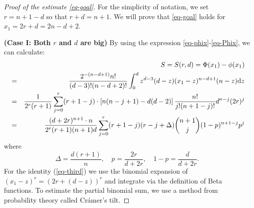 \documentclass[12pt]{amsart}
\theoremstyle{definition}
\def\dif{{\rm d}}
\begin{document}
\begin{proof}[Proof of the estimate \eqref{eq-goal}]\label{proof-goal}
For the simplicity of notation, we set $r=n+1-d$ so that $r+d=n+1$. 
We will prove that \eqref{eq-goal} holds for $x_1=2r+d=2n-d+2$. 

\textbf{(Case I: Both $r$ and $d$ are big)}
By using the expression \eqref{eq-phix}-\eqref{eq-Phix}, we can calculate:
  \begin{eqnarray}
  && S=S(r,d)=\Phi(x_1)-\phi(x_1)\nonumber\\
  &=&\frac{2^{-(n-d+1)}n!}{(d-3)!(n-d+2)!}\int_0^d z^{d-3}(d-z)(x_1-z)^{n-d+1}(n-z)\dif z\label{eq-Psiint}\\
   &=& \frac{1}{2^r(r+1)}\sum_{j=0}^r (r+1-j)\cdot\left[ n(n-j+1)-d(d-2)\right] \frac{n!}{j!(n+1-j)!} d^{n-j}(2r)^j \label{eq-third}\\
   &=& \frac{(d+2r)^{n+1}\cdot n}{2^r(r+1)(n+1)d}\sum_{j=0}^r (r+1-j)(r-j+\Delta)\binom{n+1}{j}(1-p)^{n+1-j}p^j \label{eq-Psipro}
\end{eqnarray}
where 
\begin{equation*}
\Delta=\frac{d(r+1)}{n}, \quad 
p=\frac{2r}{d+2r}, \quad 1-p=\frac{d}{d+2r}.
\end{equation*}
For the identity (\ref{eq-third}) we use the binomial expansion of $(x_1-z)^{r}=(2r+(d-z))^r$ and integrate via the definition of Beta functions. 
To estimate the partial binomial sum, we use a method from probability theory called Cr\'{a}mer's tilt. 

\end{proof}
\end{document}
